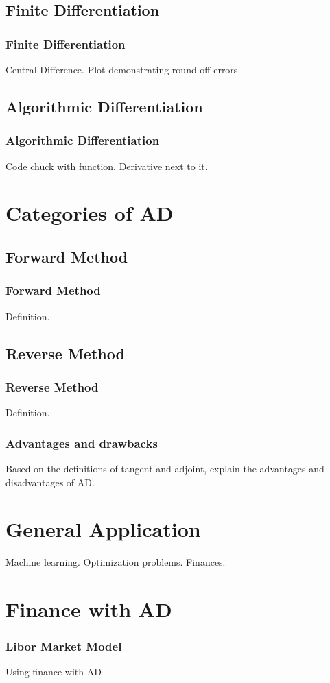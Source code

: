 \documentclass[t]{beamer}
\begin{document}
\subsection{Finite Differentiation}
\begin{frame}
	\frametitle{Finite Differentiation} 
	Central Difference. Plot demonstrating round-off errors. 
\end{frame}

\subsection{Algorithmic Differentiation}
\begin{frame}
	\frametitle{Algorithmic Differentiation}
 	Code chuck with function. Derivative next to it. 
\end{frame}

\section{Categories of AD}
\subsection{Forward Method}
\begin{frame}\frametitle{Forward Method} Definition.\end{frame}
\subsection{Reverse Method}
\begin{frame}\frametitle{Reverse Method} Definition.\end{frame}

\begin{frame}\frametitle{Advantages and drawbacks}
 Based on the definitions of tangent and adjoint, explain the advantages and disadvantages of AD.
\end{frame}

\section{General Application}
\begin{frame} Machine learning. Optimization problems. Finances. \end{frame}

\section{Finance with AD}
\begin{frame}\frametitle{Libor Market Model} Using finance with AD \end{frame}
\end{document}
